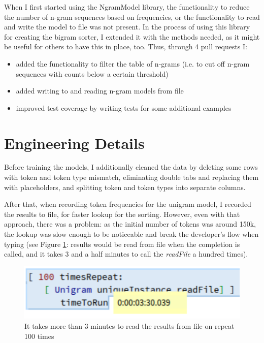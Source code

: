 When I first started using the NgramModel library, the functionality to reduce the number of n-gram sequences based on frequencies, or the functionality to read and write the model to file was not present. In the process of using this library for creating the bigram sorter, I extended it with the methods needed, as it might be useful for others to have this in place, too. Thus, through 4 pull requests I:
\begin{itemize}
    \item added the functionality to filter the table of n-grams (i.e. to cut off n-gram sequences with counts below a certain threshold)
    \item added writing to and reading n-gram models from file
    \item improved test coverage by writing tests for some additional examples
\end{itemize}

\section{Engineering Details}
\label{sec:ProposedSolution-Engineering}
Before training the models, I additionally cleaned the data by deleting some rows with token and token type mismatch, eliminating double tabs and replacing them with placeholders, and splitting token and token types into separate columns.

After that, when recording token frequencies for the unigram model, I recorded the results to file, for faster lookup for the sorting. However, even with that approach, there was a problem: as the initial number of tokens was around 150k, the lookup was slow enough to be noticeable and break the developer's flow when typing (see Figure \ref{fig:sorterSlow}: results would be read from file when the completion is called, and it takes 3 and a half minutes to call the \textit{readFile} a hundred times).

\begin{figure}[H]
    \centering
    \includegraphics[width=0.7\linewidth]{images/unigramTimeToRunSlow.png}
    \caption{It takes more than 3 minutes to read the results from file on repeat 100 times}
    \label{fig:sorterSlow}
\end{figure}

